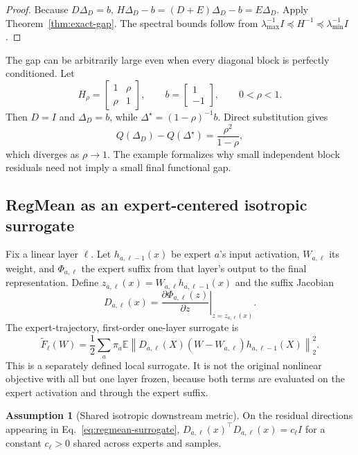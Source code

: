 \documentclass[letterpaper]{article} %
\theoremstyle{plain}
\theoremstyle{definition}
\newtheorem{assumption}[theorem]{Assumption}
\begin{document}
\begin{proof}
Because $D\Delta_D=b$, $H\Delta_D-b=(D+E)\Delta_D-b=E\Delta_D$.
Apply Theorem~\ref{thm:exact-gap}.
The spectral bounds follow from $\lambda_{\max}^{-1}I\preceq H^{-1}\preceq\lambda_{\min}^{-1}I$.
\end{proof}

The gap can be arbitrarily large even when every diagonal block is perfectly conditioned.
Let \[ H_\rho=\begin{bmatrix}1&\rho\\ \rho&1\end{bmatrix}, \qquad b=\begin{bmatrix}1\\-1\end{bmatrix}, \qquad 0<\rho<1.
\] Then $D=I$ and $\Delta_D=b$, while $\Delta^\star=(1-\rho)^{-1}b$.
Direct substitution gives
\begin{equation}
Q(\Delta_D)-Q(\Delta^\star)=\frac{\rho^2}{1-\rho},
\label{eq:cross-layer-example}
\end{equation}
which diverges as $\rho\to1$.
The example formalizes why small independent block residuals need not imply a small final functional gap.

\subsection{RegMean as an expert-centered isotropic surrogate}
\label{app:regmean-proof}

Fix a linear layer $\ell$.
Let $h_{a,\ell-1}(x)$ be expert $a$'s input activation, $W_{a,\ell}$ its weight, and $\Phi_{a,\ell}$ the expert suffix from that layer's output to the final representation.
Define $z_{a,\ell}(x)=W_{a,\ell}h_{a,\ell-1}(x)$ and the suffix Jacobian \[ D_{a,\ell}(x)= \left.\frac{\partial\Phi_{a,\ell}(z)}{\partial z} \right|_{z=z_{a,\ell}(x)}.
\] The expert-trajectory, first-order one-layer surrogate is
\begin{equation}
\widetilde F_\ell(W)=
\frac12\sum_a\pi_a\mathbb E
\left\|
D_{a,\ell}(X)(W-W_{a,\ell})h_{a,\ell-1}(X)
\right\|_2^2.
\label{eq:regmean-surrogate}
\end{equation}
This is a separately defined local surrogate.
It is not the original nonlinear objective with all but one layer frozen, because both terms are evaluated on the expert activation and through the expert suffix.

\begin{assumption}[Shared isotropic downstream metric]
\label{ass:isotropic}
On the residual directions appearing in Eq.~\eqref{eq:regmean-surrogate}, $D_{a,\ell}(x)^\top D_{a,\ell}(x)=c_\ell I$ for a constant $c_\ell>0$ shared across experts and samples.
\end{assumption}
\end{document}
